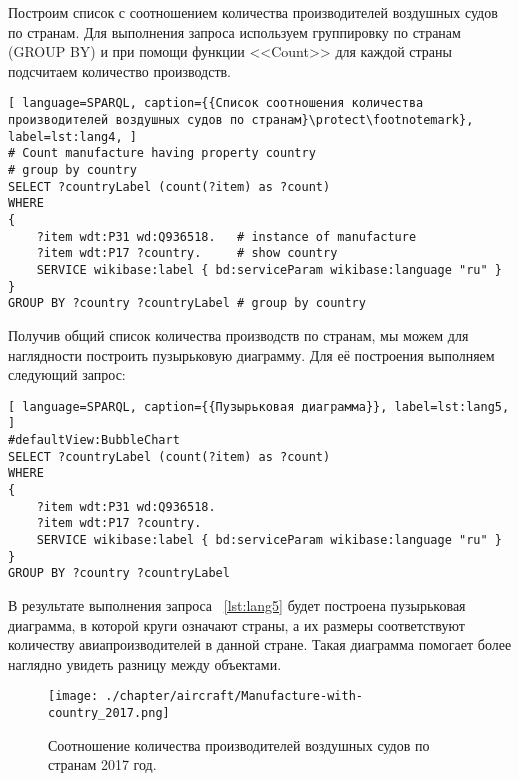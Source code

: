 Построим список с соотношением количества производителей воздушных судов по странам. Для выполнения запроса используем группировку по странам (GROUP BY) и при помощи функции <<Count>> для каждой страны подсчитаем количество производств.

\begin{lstlisting}[ language=SPARQL, caption={{Список соотношения количества производителей воздушных судов по странам}\protect\footnotemark}, label=lst:lang4, ]
# Count manufacture having property country
# group by country
SELECT ?countryLabel (count(?item) as ?count)
WHERE
{
    ?item wdt:P31 wd:Q936518.   # instance of manufacture
    ?item wdt:P17 ?country.     # show country
    SERVICE wikibase:label { bd:serviceParam wikibase:language "ru" }
}
GROUP BY ?country ?countryLabel # group by country
\end{lstlisting}


Получив общий список количества производств по странам, мы можем для наглядности построить пузырьковую диаграмму. Для её построения выполняем следующий запрос:

\begin{lstlisting}[ language=SPARQL, caption={{Пузырьковая диаграмма}}, label=lst:lang5, ]
#defaultView:BubbleChart
SELECT ?countryLabel (count(?item) as ?count)
WHERE
{
    ?item wdt:P31 wd:Q936518.
  	?item wdt:P17 ?country.
    SERVICE wikibase:label { bd:serviceParam wikibase:language "ru" }
}
GROUP BY ?country ?countryLabel
\end{lstlisting}

В результате выполнения запроса ~\ref{lst:lang5} будет построена пузырьковая диаграмма, в которой круги означают страны, а их размеры соответствуют количеству авиапроизводителей в данной стране. Такая диаграмма помогает более наглядно увидеть разницу между объектами.
 
\begin{figure}[h!]
\centering
	\texttt{[image: ./chapter/aircraft/Manufacture-with-country\_2017.png]}
	\caption{Соотношение количества производителей воздушных судов по странам 2017 год.}
	\label{fig:Manufacture_with_country_2017}
\end{figure}


